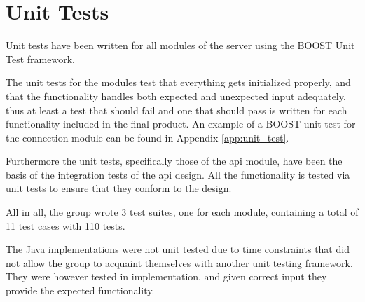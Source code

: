 \section{Unit Tests}
Unit tests have been written for all modules of the server using the BOOST Unit Test framework. 

The unit tests for the modules test that everything gets initialized properly, and that the functionality handles both expected and unexpected input adequately, thus at least a test that should fail and one that should pass is written for each functionality included in the final product. An example of a BOOST unit test for the connection module can be found in Appendix \ref{app:unit_test}.

Furthermore the unit tests, specifically those of the \ac{api} module, have been the basis of the integration tests of the \ac{api} design. All the functionality is tested via unit tests to ensure that they conform to the design.

All in all, the group wrote 3 test suites, one for each module, containing a total of 11 test cases with 110 tests. 

The Java implementations were not unit tested due to time constraints that did not allow the group to acquaint themselves with another unit testing framework. They were however tested in implementation, and given correct input they provide the expected functionality.
